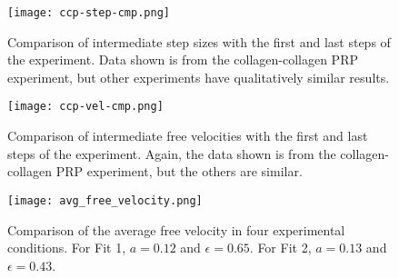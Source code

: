 \documentclass{article}
\begin{document}


\begin{figure}
  \centering
  \texttt{[image: ccp-step-cmp.png]}
  \caption{Comparison of intermediate step sizes with the first and
    last steps of the experiment. Data shown is from the
    collagen-collagen PRP experiment, but other experiments have
    qualitatively similar results.}
  \label{fig:ccp-step-cmp}
\end{figure}

\begin{figure}
  \centering
  \texttt{[image: ccp-vel-cmp.png]}
  \caption{Comparison of intermediate free velocities with the first
    and last steps of the experiment. Again, the data shown is from
    the collagen-collagen PRP experiment, but the others are similar.}
  \label{fig:ccp-vel-cmp}
\end{figure}

\begin{figure}
  \centering
  \texttt{[image: avg\_free\_velocity.png]}
  \caption{Comparison of the average free velocity in four
    experimental conditions. For Fit 1, $a = 0.12$ and $\epsilon =
    0.65$. For Fit 2, $a = 0.13$ and $\epsilon = 0.43$.}
  \label{fig:avg-free-vel}
\end{figure}
\end{document}
